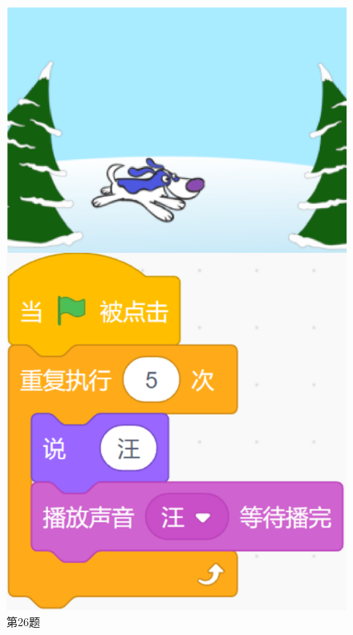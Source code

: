 \documentclass[10pt, a4paper]{article}
\begin{document}
\begin{figure}[htbp]
\begin{minipage}[t]{.14\textwidth}
            \includegraphics[width=\textwidth]{26.png}
            \caption*{第26题}
        \end{minipage}
        \begin{minipage}[t]{.2\textwidth}
            \centering

\end{minipage}
\end{figure}
\end{document}
